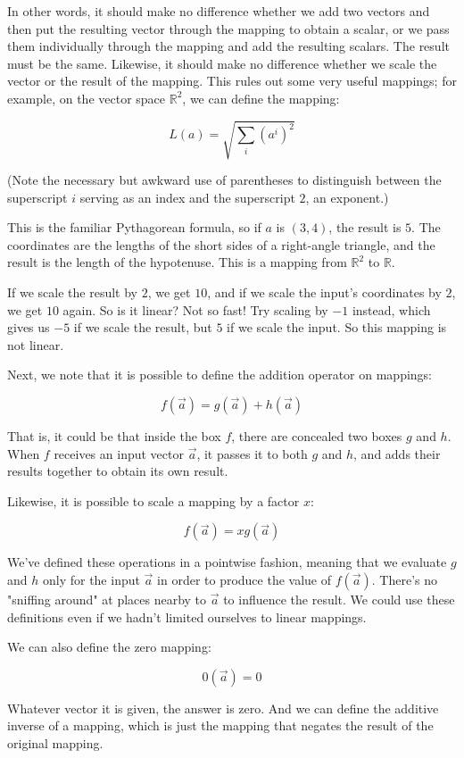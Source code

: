In other words, it should make no difference whether we add two vectors and then put the resulting vector through the mapping to obtain a scalar, or we pass them individually through the mapping and add the resulting scalars. The result must be the same. Likewise, it should make no difference whether we scale the vector or the result of the mapping. This rules out some very useful mappings; for example, on the vector space $\mathbb{R}^2$, we can define the mapping:

$$
L(a) = \sqrt{ \sum_i (a^i)^2 }
$$

(Note the necessary but awkward use of parentheses to distinguish between the superscript $i$ serving as an index and the superscript $2$, an exponent.)

This is the familiar Pythagorean formula, so if $a$ is $(3, 4)$, the result is $5$. The coordinates are the lengths of the short sides of a right-angle triangle, and the result is the length of the hypotenuse. This is a mapping from $\mathbb{R}^2$ to $\mathbb{R}$.

If we scale the result by $2$, we get $10$, and if we scale the input's coordinates by $2$, we get $10$ again. So is it linear? Not so fast! Try scaling by $-1$ instead, which gives us $-5$ if we scale the result, but $5$ if we scale the input. So this mapping is not linear. 

Next, we note that it is possible to define the addition operator on mappings:

$$
f(\vec{a}) = g(\vec{a}) + h(\vec{a})
$$

That is, it could be that inside the box $f$, there are concealed two boxes $g$ and $h$. When $f$ receives an input vector $\vec{a}$, it passes it to both $g$ and $h$, and adds their results together to obtain its own result.

Likewise, it is possible to scale a mapping by a factor $x$:

$$
f(\vec{a}) = x g(\vec{a})
$$

We've defined these operations in a pointwise fashion, meaning that we evaluate $g$ and $h$ only for the input $\vec{a}$ in order to produce the value of $f(\vec{a})$. There's no "sniffing around" at places nearby to $\vec{a}$ to influence the result. We could use these definitions even if we hadn't limited ourselves to linear mappings.

We can also define the zero mapping:

$$
0(\vec{a}) = 0
$$

Whatever vector it is given, the answer is zero. And we can define the additive inverse of a mapping, which is just the mapping that negates the result of the original mapping.

